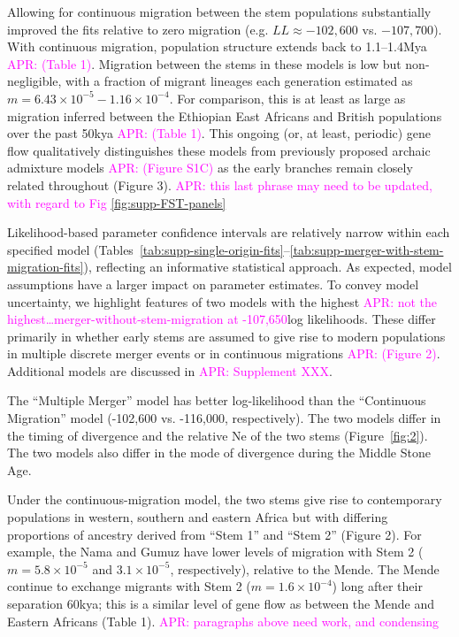 \documentclass[]{article}
\newcommand{\aprcomment}[1]{{\textcolor{magenta}{APR: #1}}}
\begin{document}
Allowing for continuous migration between the stem populations substantially
improved the fits relative to zero migration (e.g. $LL \approx -102,600$ vs.
$-107,700$). With continuous migration, population structure extends back to
1.1--1.4Mya \aprcomment{(Table 1)}. Migration between the stems in these models
is low but non-negligible, with a fraction of migrant lineages each generation
estimated as $m=6.43\times10^{-5}-1.16\times10^{-4}$. For comparison, this is
at least as large as migration inferred between the Ethiopian East Africans and
British populations over the past 50kya \aprcomment{(Table 1)}. This ongoing
(or, at least, periodic) gene flow qualitatively distinguishes these models
from previously proposed archaic admixture models \aprcomment{(Figure S1C)} as
the early branches remain closely related throughout (Figure 3).
\aprcomment{this last phrase may need to be updated, with regard to Fig
\ref{fig:supp-FST-panels}}

Likelihood-based parameter confidence intervals are relatively narrow within
each specified model
(Tables~\ref{tab:supp-single-origin-fits}--\ref{tab:supp-merger-with-stem-migration-fits}),
reflecting an informative statistical approach. As expected, model assumptions
have a larger impact on parameter estimates. To convey model uncertainty, we
highlight features of two models with the highest \aprcomment{not the
highest\ldots merger-without-stem-migration at -107,650}log likelihoods. These
differ primarily in whether early stems are assumed to give rise to modern
populations in multiple discrete merger events or in continuous migrations
\aprcomment{(Figure 2)}. Additional models are discussed in
\aprcomment{Supplement XXX}.

The “Multiple Merger” model has better log-likelihood than the “Continuous
Migration” model (-102,600 vs. -116,000, respectively). The two models differ
in the timing of divergence and the relative Ne of the two stems
(Figure~\ref{fig:2}). The two models also differ in the mode of divergence
during the Middle Stone Age. 

Under the continuous-migration model, the two stems give rise to contemporary
populations in western, southern and eastern Africa but with differing
proportions of ancestry derived from “Stem 1” and “Stem 2” (Figure 2). For
example, the Nama and Gumuz have lower levels of migration with Stem 2
($m=5.8\times10^{-5}$ and $3.1\times10^{-5}$, respectively), relative to the
Mende. The Mende continue to exchange migrants with Stem 2
($m=1.6\times10^{-4}$) long after their separation 60kya; this is a similar
level of gene flow as between the Mende and Eastern Africans (Table 1). 
\aprcomment{paragraphs above need work, and condensing}
\end{document}
